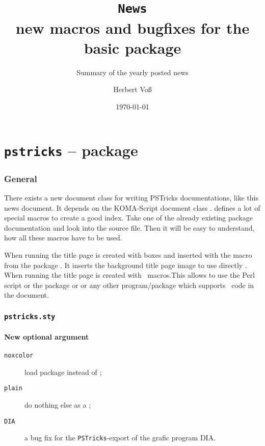 \documentclass[11pt,english,BCOR10mm,DIV12,bibliography=totoc,parskip=false,smallheadings
    headexclude,footexclude,oneside]{pst-doc}
\let\Lfile\LFile
\begin{document}
\title{\texttt{News}\\ \Large new macros and bugfixes for the
basic package }
\subtitle{Summary of the yearly posted news}
\author{Herbert Voß}
\date{\today}

\maketitle

\clearpage
\tableofcontents

\clearpage
\part{\texttt{pstricks} -- package}

\section{General}
There exists a new document class  for writing PSTricks documentations,
like this news document. It depends on the KOMA-Script document class .
 defines a lot of special macros to create a good index. Take one of
the already existing package documentation and look into the source file. Then it will be
easy to understand, how all these macros have to be used.

When running  the title page is created with boxes and inserted 
with the macro  from the package . It
inserts the background title page image \Lfile{pst-doc-pdf} to use directly
.
When running  the title page
 is created with \PST\ macros.This allows to use the Perl script  or
the package  or  or any other program/package which
supports \PS\ code in the document.


\section{\texttt{pstricks.sty}}
\subsection{New optional argument}

\begin{description}
\item[\texttt{noxcolor}] load package  instead of  ;
\item[\texttt{plain}] do nothing else as a ; 
\item[\texttt{DIA}] a bug fix for the \verb+PSTricks+-export of the grafic program DIA.
\end{description}
\end{document}
